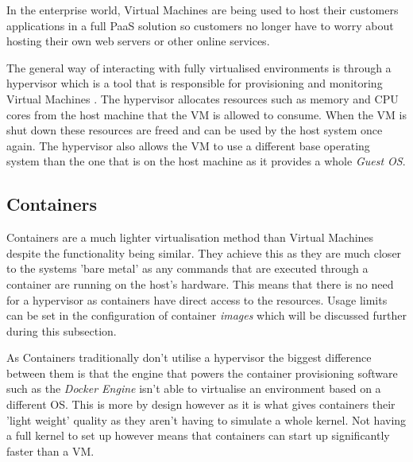In the enterprise world, Virtual Machines are being used to host their customers applications in a full PaaS solution so customers no longer have to worry about hosting their own web servers or other online services.

The general way of interacting with fully virtualised environments is through a hypervisor which is a tool that is responsible for provisioning and monitoring Virtual Machines \cite{hypervisor}. The hypervisor allocates resources such as memory and CPU cores from the host machine that the VM is allowed to consume. When the VM is shut down these resources are freed and can be used by the host system once again. The hypervisor also allows the VM to use a different base operating system than the one that is on the host machine as it provides a whole \textit{Guest OS}.

\subsection{Containers}

Containers are a much lighter virtualisation method than  Virtual Machines despite the functionality being similar. They achieve this as they are much closer to the systems 'bare metal' as any commands that are executed through a container are running on the host's hardware. This means that there is no need for a hypervisor as containers have direct access to the resources. Usage limits can be set in the configuration of container \textit{images} which will be discussed further during this subsection.

As Containers traditionally don't utilise a hypervisor the biggest difference between them is that the engine that powers the container provisioning software such as the \textit{Docker Engine} isn't able to virtualise an environment based on a different OS. This is more by design however as it is what gives containers their 'light weight' quality as they aren't having to simulate a whole kernel. Not having a full kernel to set up however means that containers can start up significantly faster than a VM.

